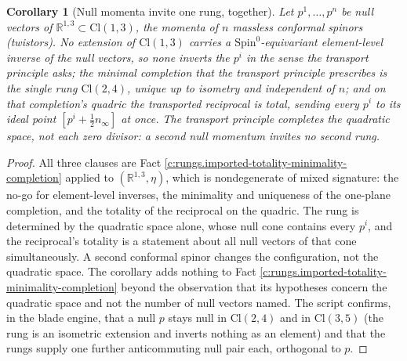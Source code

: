 \documentclass[11pt]{article}
\newtheorem{corollary}[theorem]{Corollary}
\theoremstyle{definition}
\theoremstyle{plain}
\providecommand{\Cl}{}\renewcommand{\Cl}{\mathrm{Cl}}
\providecommand{\R}{}\renewcommand{\R}{\mathbb{R}}
\begin{document}
\begin{corollary}[Null momenta invite one rung, together]\label{c:rungs.fact-null-momenta-invite-one-rung}
Let $p^{1}, \ldots, p^{n}$ be null vectors of $\R^{1,3} \subset \Cl(1,3)$, the momenta of $n$ massless conformal spinors (twistors). No extension of $\Cl(1,3)$ carries a $\mathrm{Spin}^{0}$-equivariant element-level inverse of the null vectors, so none inverts the $p^{i}$ in the sense the transport principle asks; the minimal completion that the transport principle prescribes is the single rung $\Cl(2,4)$, unique up to isometry and independent of $n$; and on that completion's quadric the transported reciprocal is total, sending every $p^{i}$ to its ideal point $[p^{i} + \tfrac12 n_{\infty}]$ at once. The transport principle completes the quadratic space, not each zero divisor: a second null momentum invites no second rung.
\end{corollary}
\begin{proof}
All three clauses are Fact \ref{c:rungs.imported-totality-minimality-completion} applied to $(\R^{1,3}, \eta)$, which is nondegenerate of mixed signature: the no-go for element-level inverses, the minimality and uniqueness of the one-plane completion, and the totality of the reciprocal on the quadric. The rung is determined by the quadratic space alone, whose null cone contains every $p^{i}$, and the reciprocal's totality is a statement about all null vectors of that cone simultaneously. A second conformal spinor changes the configuration, not the quadratic space. The corollary adds nothing to Fact \ref{c:rungs.imported-totality-minimality-completion} beyond the observation that its hypotheses concern the quadratic space and not the number of null vectors named. The script confirms, in the blade engine, that a null $p$ stays null in $\Cl(2,4)$ and in $\Cl(3,5)$ (the rung is an isometric extension and inverts nothing as an element) and that the rungs supply one further anticommuting null pair each, orthogonal to $p$.

\end{proof}
\end{document}
